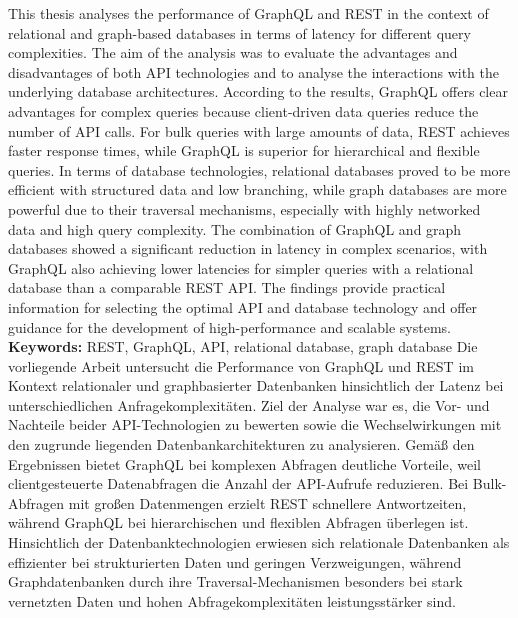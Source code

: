 \label{sec:abstract}
This thesis analyses the performance of GraphQL and REST in the context of relational and graph-based databases in terms of latency for different query complexities. The aim of the analysis was to evaluate the advantages and disadvantages of both API technologies and to analyse the interactions with the underlying database architectures.
\newline
\noindent
According to the results, GraphQL offers clear advantages for complex queries because client-driven data queries reduce the number of API calls. For bulk queries with large amounts of data, REST achieves faster response times, while GraphQL is superior for hierarchical and flexible queries. In terms of database technologies, relational databases proved to be more efficient with structured data and low branching, while graph databases are more powerful due to their traversal mechanisms, especially with highly networked data and high query complexity.
\newline
\noindent
The combination of GraphQL and graph databases showed a significant reduction in latency in complex scenarios, with GraphQL also achieving lower latencies for simpler queries with a relational database than a comparable REST API. The findings provide practical information for selecting the optimal API and database technology and offer guidance for the development of high-performance and scalable systems.
\newline
\noindent
\textbf{Keywords:} REST, GraphQL, API, relational database, graph database
\newpage
{} %
\label{sec:zusammenfassung}
Die vorliegende Arbeit untersucht die Performance von GraphQL und REST im Kontext relationaler und graphbasierter Datenbanken hinsichtlich der Latenz bei unterschiedlichen Anfragekomplexitäten. Ziel der Analyse war es, die Vor- und Nachteile beider API-Technologien zu bewerten sowie die Wechselwirkungen mit den zugrunde liegenden Datenbankarchitekturen zu analysieren.
\newline
\noindent
Gemäß den Ergebnissen bietet GraphQL bei komplexen Abfragen deutliche Vorteile, weil clientgesteuerte Datenabfragen die Anzahl der API-Aufrufe reduzieren. Bei Bulk-Abfragen mit großen Datenmengen erzielt REST schnellere Antwortzeiten, während GraphQL bei hierarchischen und flexiblen Abfragen überlegen ist. Hinsichtlich der Datenbanktechnologien erwiesen sich relationale Datenbanken als effizienter bei strukturierten Daten und geringen Verzweigungen, während Graphdatenbanken durch ihre Traversal-Mechanismen besonders bei stark vernetzten Daten und hohen Abfragekomplexitäten leistungsstärker sind.
